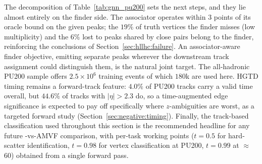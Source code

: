 The decomposition of Table~\ref{tab:gnn_pu200} sets the next steps, and they
lie almost entirely on the finder side. The associator operates within $3$
points of its oracle bound on the given peaks; the $19\%$ of truth vertices
the finder misses (low multiplicity) and the $6\%$ lost to peaks shared by
close pairs belong to the finder, reinforcing the conclusions of
Section~\ref{sec:hllhc:failure}. An associator-aware finder objective,
emitting separate peaks wherever the downstream track assignment could
distinguish them, is the natural joint target. The all-hadronic PU200 sample
offers $2.5\times10^{6}$ training events of which $180$k are used here. HGTD
timing remains a forward-track feature: $4.0\%$ of PU200 tracks carry a valid
time overall, but $44.6\%$ of tracks with $|\eta|>2.3$ do, so a
time-augmented edge significance is expected to pay off specifically where
$z$-ambiguities are worst, as a targeted forward study
(Section~\ref{sec:negative:timing}). Finally, the track-based classification
used throughout this section is the recommended headline for any future
\pvf{}-vs-AMVF comparison, with per-task working points ($t=0.5$ for
hard-scatter identification, $t=0.98$ for vertex classification at PU200,
$t=0.99$ at \muavg{}$\approx$60) obtained from a single forward pass.
